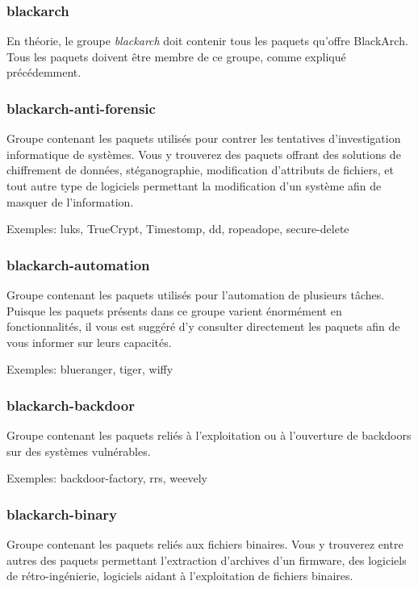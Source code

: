 \documentclass[a4paper, oneside, 11pt]{book}
\begin{document}
\subsubsection{blackarch}

En th\'{e}orie, le groupe \textit{blackarch} doit contenir tous les paquets qu'offre BlackArch. Tous les paquets doivent \^{e}tre membre de ce groupe, comme expliqu\'{e} pr\'{e}c\'{e}demment.

\subsubsection{blackarch-anti-forensic}

Groupe contenant les paquets utilis\'{e}s pour contrer les tentatives
d'investigation informatique de syst\`{e}mes. Vous y trouverez des paquets offrant
des solutions de chiffrement de donn\'{e}es, st\'{e}ganographie, modification d'attributs de fichiers, et tout autre type de logiciels permettant la modification d'un syst\`{e}me afin de masquer de l'information.

Exemples: luks, TrueCrypt, Timestomp, dd, ropeadope, secure-delete

\subsubsection{blackarch-automation}

Groupe contenant les paquets utilis\'{e}s pour l'automation de plusieurs t\^{a}ches.
Puisque les paquets pr\'{e}sents dans ce groupe varient \'{e}norm\'{e}ment en
fonctionnalit\'{e}s, il vous est sugg\'{e}r\'{e} d'y consulter directement les paquets
afin de vous informer sur leurs capacit\'{e}s.

Exemples: blueranger, tiger, wiffy

\subsubsection{blackarch-backdoor}

Groupe contenant les paquets reli\'{e}s \`{a} l'exploitation ou \`{a} l'ouverture de
backdoors sur des syst\`{e}mes vuln\'{e}rables.

Exemples: backdoor-factory, rrs, weevely

\subsubsection{blackarch-binary}

Groupe contenant les paquets reli\'{e}s aux fichiers binaires. Vous y trouverez entre autres des paquets permettant l'extraction d'archives d'un firmware, des logiciels de
r\'{e}tro-ing\'{e}nierie, logiciels aidant \`{a} l'exploitation de fichiers binaires.
\end{document}
